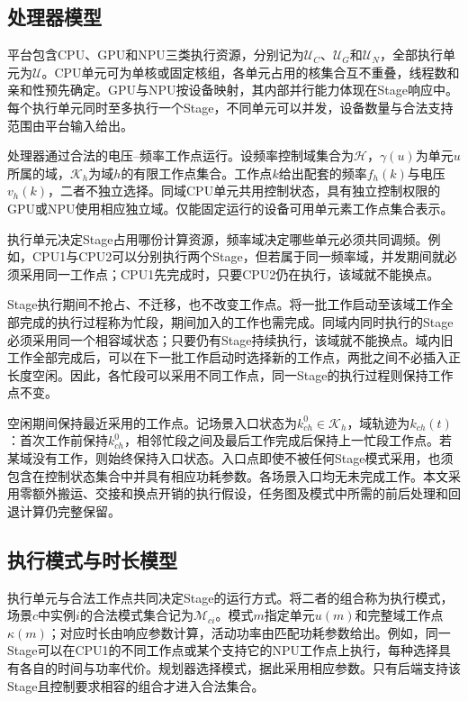 \subsection{处理器模型}

平台包含CPU、GPU和NPU三类执行资源，分别记为\(\mathcal U_C\)、\(\mathcal U_G\)和\(\mathcal U_N\)，全部执行单元为\(\mathcal U\)。CPU单元可为单核或固定核组，各单元占用的核集合互不重叠，线程数和亲和性预先确定。GPU与NPU按设备映射，其内部并行能力体现在Stage响应中。每个执行单元同时至多执行一个Stage，不同单元可以并发，设备数量与合法支持范围由平台输入给出。

处理器通过合法的电压--频率工作点运行。设频率控制域集合为\(\mathcal H\)，\(\gamma(u)\)为单元\(u\)所属的域，\(\mathcal K_h\)为域\(h\)的有限工作点集合。工作点\(k\)给出配套的频率\(f_h(k)\)与电压\(v_h(k)\)，二者不独立选择。同域CPU单元共用控制状态，具有独立控制权限的GPU或NPU使用相应独立域。仅能固定运行的设备可用单元素工作点集合表示。

执行单元决定Stage占用哪份计算资源，频率域决定哪些单元必须共同调频。例如，CPU1与CPU2可以分别执行两个Stage，但若属于同一频率域，并发期间就必须采用同一工作点；CPU1先完成时，只要CPU2仍在执行，该域就不能换点。

Stage执行期间不抢占、不迁移，也不改变工作点。将一批工作启动至该域工作全部完成的执行过程称为忙段，期间加入的工作也需完成。同域内同时执行的Stage必须采用同一个相容域状态；只要仍有Stage持续执行，该域就不能换点。域内旧工作全部完成后，可以在下一批工作启动时选择新的工作点，两批之间不必插入正长度空闲。因此，各忙段可以采用不同工作点，同一Stage的执行过程则保持工作点不变。

空闲期间保持最近采用的工作点。记场景入口状态为\(k^0_{ch}\in\mathcal K_h\)，域轨迹为\(k_{ch}(t)\)：首次工作前保持\(k^0_{ch}\)，相邻忙段之间及最后工作完成后保持上一忙段工作点。若某域没有工作，则始终保持入口状态。入口点即使不被任何Stage模式采用，也须包含在控制状态集合中并具有相应功耗参数。各场景入口均无未完成工作。本文采用零额外搬运、交接和换点开销的执行假设，任务图及模式中所需的前后处理和回退计算仍完整保留。

\subsection{执行模式与时长模型}

执行单元与合法工作点共同决定Stage的运行方式。将二者的组合称为执行模式，场景\(c\)中实例\(i\)的合法模式集合记为\(\mathcal M_{ci}\)。模式\(m\)指定单元\(u(m)\)和完整域工作点\(\kappa(m)\)；对应时长由响应参数计算，活动功率由匹配功耗参数给出。例如，同一Stage可以在CPU1的不同工作点或某个支持它的NPU工作点上执行，每种选择具有各自的时间与功率代价。规划器选择模式，据此采用相应参数。只有后端支持该Stage且控制要求相容的组合才进入合法集合。

